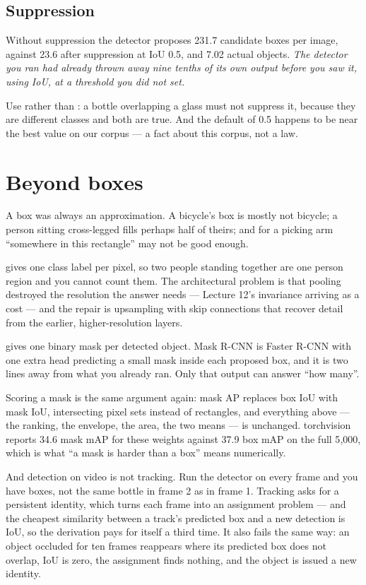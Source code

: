 \documentclass[11pt,a4paper]{article}
\begin{document}
\subsection{Suppression}

Without suppression the detector proposes 231.7 candidate boxes per image,
against 23.6 after suppression at IoU 0.5, and 7.02 actual objects. \emph{The
detector you ran had already thrown away nine tenths of its own output before
you saw it, using IoU, at a threshold you did not set.}

Use  rather than : a bottle overlapping a glass
must not suppress it, because they are different classes and both are true. And
the default of 0.5 happens to be near the best value on our corpus --- a fact
about this corpus, not a law.

\section{Beyond boxes}

A box was always an approximation. A bicycle's box is mostly not bicycle; a
person sitting cross-legged fills perhaps half of theirs; and for a picking arm
``somewhere in this rectangle'' may not be good enough.

 gives one class label per pixel, so two people
standing together are one person region and you cannot count them. The
architectural problem is that pooling destroyed the resolution the answer needs
--- Lecture 12's invariance arriving as a cost --- and the repair is upsampling
with skip connections that recover detail from the earlier, higher-resolution
layers.

 gives one binary mask per detected object. Mask
R-CNN is Faster R-CNN with one extra head predicting a small mask inside each
proposed box, and it is two lines away from what you already ran. Only that
output can answer ``how many''.

Scoring a mask is the same argument again: mask AP replaces box IoU with mask
IoU, intersecting pixel sets instead of rectangles, and everything above ---
the ranking, the envelope, the area, the two means --- is unchanged.
torchvision reports 34.6 mask mAP for these weights against 37.9 box mAP on the
full 5{,}000, which is what ``a mask is harder than a box'' means numerically.

And detection on video is not tracking. Run the detector on every frame and you
have boxes, not the same bottle in frame 2 as in frame 1. Tracking asks for a
persistent identity, which turns each frame into an assignment problem --- and
the cheapest similarity between a track's predicted box and a new detection is
IoU, so the derivation pays for itself a third time. It also fails the same
way: an object occluded for ten frames reappears where its predicted box does
not overlap, IoU is zero, the assignment finds nothing, and the object is
issued a new identity.
\end{document}
